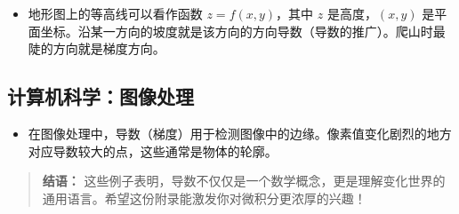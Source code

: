 \documentclass[10pt]{article}
\begin{document}
\begin{itemize}
    \item 地形图上的等高线可以看作函数 $z = f(x,y)$，其中 $z$ 是高度，$(x,y)$ 是平面坐标。沿某一方向的坡度就是该方向的方向导数（导数的推广）。爬山时最陡的方向就是梯度方向。
\end{itemize}

\subsection{计算机科学：图像处理}

\begin{itemize}
    \item 在图像处理中，导数（梯度）用于检测图像中的边缘。像素值变化剧烈的地方对应导数较大的点，这些通常是物体的轮廓。
\end{itemize}

\begin{quote}
    \textbf{结语：} 这些例子表明，导数不仅仅是一个数学概念，更是理解变化世界的通用语言。希望这份附录能激发你对微积分更浓厚的兴趣！
\end{quote}
\end{document}
